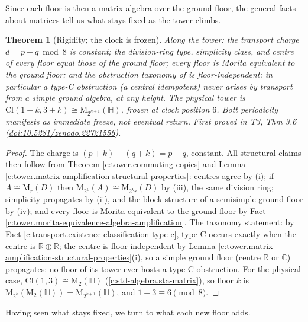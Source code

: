 \documentclass[11pt]{article}
\newtheorem{theorem}{Theorem}[section]
\theoremstyle{definition}
\theoremstyle{plain}
\providecommand{\C}{}\renewcommand{\C}{\mathbb{C}}
\providecommand{\Cl}{}\renewcommand{\Cl}{\mathrm{Cl}}
\providecommand{\HH}{}\renewcommand{\HH}{\mathbb{H}}
\providecommand{\Mat}{}\renewcommand{\Mat}{\mathrm{M}}
\providecommand{\R}{}\renewcommand{\R}{\mathbb{R}}
\begin{document}
Since each floor is then a matrix algebra over the ground floor, the general facts about matrices tell us what stays fixed as the tower climbs.

\begin{theorem}[Rigidity; the clock is frozen]\label{c:tower.rigidity-clock-frozen}
Along the tower: the transport charge $d = p - q \bmod 8$ is constant; the division-ring type, simplicity class, and centre of every floor equal those of the ground floor; every floor is Morita equivalent to the ground floor; and the obstruction taxonomy of \cite{ButlerT1} is floor-independent: in particular a type-C obstruction (a central idempotent) never arises by transport from a simple ground algebra, at any height. The physical tower is $\Cl(1{+}k, 3{+}k) \cong \Mat_{2^{k+1}}(\HH)$, frozen at clock position $6$. Bott periodicity manifests as immediate freeze, not eventual return.
\emph{First proved in} T3, Thm 3.6 (\href{https://doi.org/10.5281/zenodo.22721556}{doi:10.5281/zenodo.22721556}).
\end{theorem}
\begin{proof}
The charge is $(p{+}k) - (q{+}k) = p - q$, constant. All structural claims then follow from Theorem \ref{c:tower.commuting-copies} and Lemma \ref{c:tower.matrix-amplification-structural-properties}: centres agree by (i); if $A \cong \Mat_r(D)$ then $\Mat_{2^k}(A) \cong \Mat_{2^k r}(D)$ by (iii), the same division ring; simplicity propagates by (ii), and the block structure of a semisimple ground floor by (iv); and every floor is Morita equivalent to the ground floor by Fact \ref{c:tower.morita-equivalence-algebra-amplification}. The taxonomy statement: by Fact \ref{c:transport.existence-classification-type-c}, type C occurs exactly when the centre is $\R \oplus \R$; the centre is floor-independent by Lemma \ref{c:tower.matrix-amplification-structural-properties}(i), so a simple ground floor (centre $\R$ or $\C$) propagates: no floor of its tower ever hosts a type-C obstruction. For the physical case, $\Cl(1,3) \cong \Mat_2(\HH)$ \cite{Porteous1995} (\ref{c:std-algebra.sta-matrix}), so floor $k$ is $\Mat_{2^k}(\Mat_2(\HH)) = \Mat_{2^{k+1}}(\HH)$, and $1 - 3 \equiv 6 \pmod 8$.

\end{proof}

Having seen what stays fixed, we turn to what each new floor adds.
\end{document}
